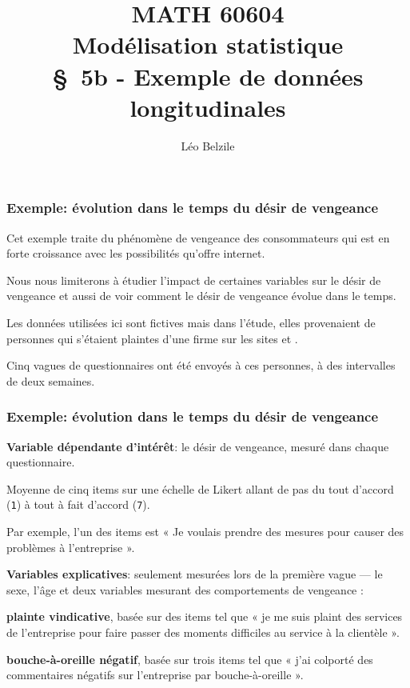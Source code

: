 \documentclass{beamer}
\title[\color{white}{MATH 60604 \S~5b - Exemple de données longitudinales}]{\texorpdfstring{MATH 60604 \\Modélisation statistique \\ \S~5b - Exemple de données longitudinales}{MATH 60604 \\Modélisation statistique \\ \S~5b - Exemple de données longitudinales}}
\author{Léo Belzile}
\institute{HEC Montréal\\
Département de sciences de la décision}
\date{}
\begin{document}
\frame{\titlepage}

\begin{frame}
\frametitle{Exemple: évolution dans le temps du désir de vengeance}
\bi
\item Cet exemple traite du phénomène de vengeance des consommateurs qui est en forte croissance avec les possibilités qu'offre internet. 
\item Nous nous limiterons à étudier l'impact de certaines variables sur le désir de vengeance et aussi de voir comment le désir de vengeance évolue dans le temps. 

\item Les données utilisées ici sont fictives mais dans l'étude, elles provenaient de personnes qui s'étaient plaintes d'une firme sur les sites  et .
\item Cinq vagues de questionnaires ont été envoyés à ces personnes, à des intervalles de deux semaines.
\ei
\end{frame}

\begin{frame}
\frametitle{Exemple: évolution dans le temps du désir de vengeance }
\bi
\item \textbf{Variable dépendante d'intérêt}: le désir de vengeance, mesuré dans chaque questionnaire. 
\bi

\item Moyenne de cinq items sur une échelle de Likert allant de pas du tout d'accord (\texttt{1}) à tout à fait d'accord (\texttt{7}). 
\item Par exemple, l'un des items est « Je voulais prendre des mesures pour causer des problèmes à l'entreprise ».
\ei
\item \textbf{Variables explicatives}: seulement mesurées lors de la première vague --- le sexe, l'âge et deux variables mesurant des comportements de vengeance :
\bi
\item \textbf{plainte vindicative}, basée sur des items tel que « je me suis plaint des services de l'entreprise pour faire passer des moments difficiles au service à la clientèle ».
\item \textbf{bouche-à-oreille négatif}, basée sur trois items tel que « j'ai colporté des commentaires négatifs sur l'entreprise par bouche-à-oreille ».
\ei
\ei
\end{frame}
\end{document}
